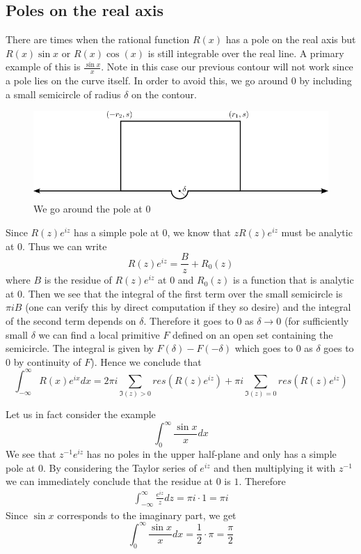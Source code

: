 \subsection{Poles on the real axis}
There are times when the rational function $R(x)$ has a pole on the real axis but $R(x) \sin x$ or $R(x) \cos(x)$ is still integrable over the real line. A primary example of this is $\frac{\sin x}{x}$. Note in this case our previous contour will not work since a pole lies on the curve itself. In order to avoid this, we go around 0 by including a small semicircle of radius $\delta$ on the contour.
\begin{figure}[ht]
    \centering
    \includegraphics{Images/real_pole_contour.png}
    \caption{We go around the pole at 0}
    \label{fig:real-pole-contour}
\end{figure}

Since $R(z)e^{iz}$ has a simple pole at $0$, we know that $zR(z) e^{iz}$ must be analytic at 0. Thus we can write
$$R(z) e^{iz} = \frac{B}{z} + R_0(z)$$
where $B$ is the residue of $R(z)e^{iz}$ at 0 and $R_0(z)$ is a function that is analytic at 0. Then we see that the integral of the first term over the small semicircle is $\pi i B$ (one can verify this by direct computation if they so desire) and the integral of the second term depends on $\delta$. Therefore it goes to 0 as $\delta \to 0$ (for sufficiently small $\delta$ we can find a local primitive $F$ defined on an open set containing the semicircle. The integral is given by $F(\delta) - F(-\delta)$ which goes to 0 as $\delta$ goes to 0 by continuity of $F$). Hence we conclude that
$$\int_{-\infty}^{\infty} R(x)e^{ix} dx = 2\pi i \sum_{\Im(z) > 0} res(R(z)e^{iz}) + \pi i \sum_{\Im(z) = 0} res(R(z) e^{iz})$$

Let us in fact consider the example
$$\int_{0}^{\infty} \frac{\sin x}{x} dx$$
We see that $z^{-1} e^{iz}$ has no poles in the upper half-plane and only has a simple pole at 0. By considering the Taylor series of $e^{iz}$ and then multiplying it with $z^{-1}$ we can immediately conclude that the residue at 0 is $1$. Therefore
\begin{align*}
    \int_{-\infty}^{\infty} \frac{e^{iz}}{z} dz = \pi i \cdot 1 = \pi i
\end{align*}
Since $\sin x$ corresponds to the imaginary part, we get 
$$ \int_{0}^{\infty} \frac{\sin x}{x} dx = \frac{1}{2} \cdot \pi  = \frac{\pi}{2} $$

